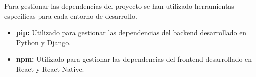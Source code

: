 Para gestionar las dependencias del proyecto se han utilizado herramientas específicas para cada entorno de desarrollo.

\begin{itemize}
    \item \textbf{pip:} Utilizado para gestionar las dependencias del backend desarrollado en Python y Django.
    \item \textbf{npm:} Utilizado para gestionar las dependencias del frontend desarrollado en React y React Native.
\end{itemize}
